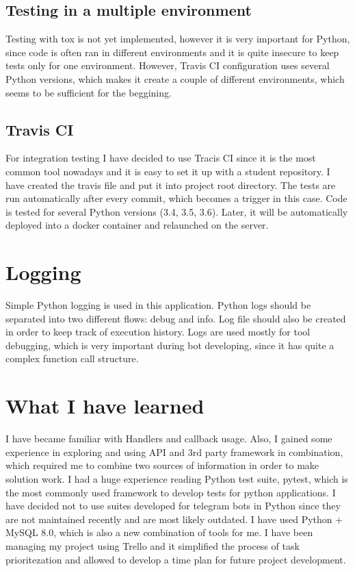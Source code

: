 \documentclass[a4paper,11pt]{article}
\begin{document}
\subsection{Testing in a multiple environment} Testing with tox is not yet implemented, however it is very important for Python, since code is often ran in different environments and it is quite insecure to keep tests only for one environment. However, Travis CI configuration uses several Python versions, which makes it create a couple of different environments, which seems to be sufficient for the beggining. 

\subsection{Travis CI}
For integration testing I have decided to use Tracis CI since it is the most common tool nowadays and it is easy to set it up with a student repository. I have created the travis file and put it into project root directory. The tests are run automatically after every commit, which becomes a trigger in this case. Code is tested for several Python versions (3.4, 3.5, 3.6). Later, it will be automatically deployed into a docker container and relaunched on the server.

\section{Logging}
Simple Python logging is used in this application. Python logs should be separated into two different flows: debug and info. Log file should also be created in order to keep track of execution history.
Logs are used mostly for tool debugging, which is very important during bot developing, since it has quite a complex function call structure.

\section{What I have learned}
I have became familiar with Handlers and callback usage. Also, I gained some experience in exploring and using API and 3rd party framework in combination, which required me to combine two sources of information in order to make solution work.
I had a huge experience reading Python test suite, pytest, which is the most commonly used framework to develop tests for python applications. I have decided not to use suites developed for telegram bots in Python since they are not maintained recently and are most likely outdated.
I have used Python + MySQL 8.0, which is also a new combination of tools for me.
I have been managing my project using Trello and it simplified the process of task prioritezation and allowed to develop a time plan for future project development.
\end{document}
